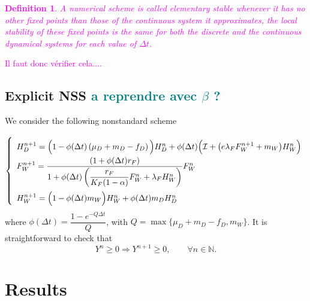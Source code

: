 \documentclass{article}
\newcommand{\cI}{\mathcal{I}}
\newcommand{\marc}[1]{\textcolor{teal}{#1}}
\newcommand{\YD}[1]{\textcolor{magenta}{#1}}
\newtheorem{definition}{Definition}
\begin{document}
\YD{
\begin{definition}
A numerical scheme is called elementary stable whenever it has no other fixed points than those of the continuous system it approximates, the local stability of these fixed points is the same for both the discrete and the continuous dynamical systems for each value of $\Delta t$.
\end{definition}
Il faut donc vérifier cela....
}

\subsection{Explicit NSS \marc{a reprendre avec $\beta$ ?}}
 We consider the following nonstandard scheme

\begin{equation}
\def\arraystretch{2}
\left\{ \begin{array}{l}
H_{D}^{n+1}=\Big(1-\phi(\Delta t) \left(\mu_{D}+m_{D}-f_{D}\right)\Big)H_{D}^{n}+ \phi(\Delta t)\Big(\cI+ \big(e\lambda_{F}F_{W}^{n+1} + m_{W}\big)H_{W}^{n}\Big)\\
F_{W}^{n+1}=\dfrac{\left(1+\phi(\Delta t)r_{F}\right)}{1+\phi(\Delta t)\left(\dfrac{r_{F}}{K_{F}(1-\alpha)}F_{W}^{n}+\lambda_{F}H_{W}^{n}\right)}F_{W}^{n}\\ 
H_{W}^{n+1}=\Big(1-\phi(\Delta t)m_{W}\Big)H_{W}^n+\phi(\Delta t)m_{D}H_{D}^n
\end{array}\right.
\end{equation}
where $\phi(\Delta t)=\dfrac{1-e^{-Q\Delta t}}{Q}$, with $Q=\max\{\mu_D+m_D-f_D,m_W\}$. 
It is straightforward to check that
$$
Y^n \geq 0 \Rightarrow Y^{n+1}\geq 0,\qquad \forall n\in \mathbb{N}.
$$

\section{Results}
\end{document}
